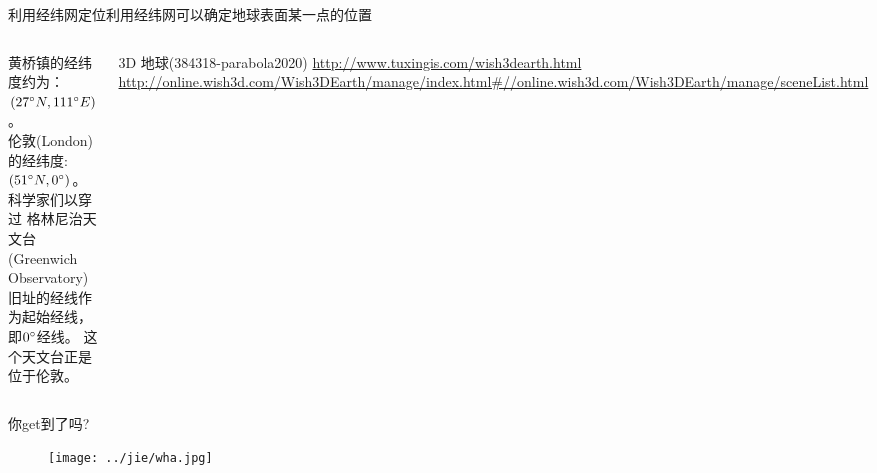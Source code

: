 \documentclass[10pt]{ctexbeamer}
\begin{document}
    \begin{frame}[fragile]{利用经纬网定位}{利用经纬网可以确定地球表面某一点的位置}
        \begin{columns}
            黄桥镇的经纬度约为：$(27\degree N, 111\degree E)$。\\
            \vspace{2em}
            \alert{伦敦(London)}的经纬度: $(51\degree N, 0\degree)$。科学家们以穿过
                格林尼治天文台(Greenwich Observatory)旧址的经线作为起始经线，即$0\degree$经线。
                这个天文台正是位于伦敦。

                \begin{block}{3D 地球(384318-parabola2020)}
                    \url{http://www.tuxingis.com/wish3dearth.html}\\
                    \url{http://online.wish3d.com/Wish3DEarth/manage/index.html#//online.wish3d.com/Wish3DEarth/manage/sceneList.html}
                \end{block}
            \begin{figure}
                \includegraphics[width=0.79\textwidth]{assets/royal ovservatory Greenwich.png}
            \end{figure}
        \end{columns}
    \end{frame}

    \begin{frame}[plain, noframenumbering, label=Question]
        \begin{center}
            \Huge{你get到了吗?}
        \end{center}
        \begin{figure}
            \texttt{[image: ../jie/wha.jpg]}
        \end{figure}
    \end{frame}
\end{document}
